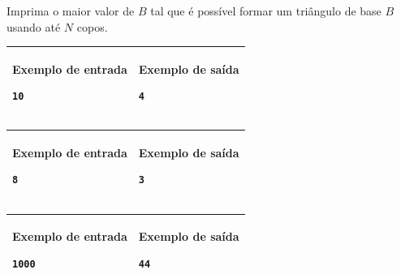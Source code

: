 Imprima o maior valor de $B$ tal que é possível formar um triângulo de base $B$
usando até $N$ copos.

\begin{table}[!h]
\centering
\begin{tabular}{|l|l|}
\hline
\begin{minipage}[t]{3in}
\textbf{Exemplo de entrada}
\begin{verbatim}
10
\end{verbatim}
\vspace{1mm}
\end{minipage}
&
\begin{minipage}[t]{3in}
\textbf{Exemplo de saída}
\begin{verbatim}
4
\end{verbatim}
\vspace{1mm}
\end{minipage} \\
\hline
\end{tabular}
\end{table}

\begin{table}[!h]
\centering
\begin{tabular}{|l|l|}
\hline
\begin{minipage}[t]{3in}
\textbf{Exemplo de entrada}
\begin{verbatim}
8
\end{verbatim}
\vspace{1mm}
\end{minipage}
&
\begin{minipage}[t]{3in}
\textbf{Exemplo de saída}
\begin{verbatim}
3
\end{verbatim}
\vspace{1mm}
\end{minipage} \\
\hline
\end{tabular}
\end{table}

\begin{table}[!h]
\centering
\begin{tabular}{|l|l|}
\hline
\begin{minipage}[t]{3in}
\textbf{Exemplo de entrada}
\begin{verbatim}
1000
\end{verbatim}
\vspace{1mm}
\end{minipage}
&
\begin{minipage}[t]{3in}
\textbf{Exemplo de saída}
\begin{verbatim}
44
\end{verbatim}
\vspace{1mm}
\end{minipage} \\
\hline
\end{tabular}
\end{table}
